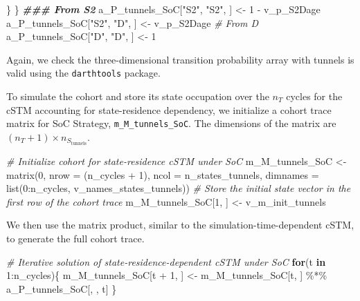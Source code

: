 \documentclass[
]{article}
\newenvironment{Shaded}{\begin{snugshade}}{\end{snugshade}}
\newcommand{\AttributeTok}[1]{\textcolor[rgb]{0.77,0.63,0.00}{#1}}
\newcommand{\CommentTok}[1]{\textcolor[rgb]{0.56,0.35,0.01}{\textit{#1}}}
\newcommand{\ControlFlowTok}[1]{\textcolor[rgb]{0.13,0.29,0.53}{\textbf{#1}}}
\newcommand{\DecValTok}[1]{\textcolor[rgb]{0.00,0.00,0.81}{#1}}
\newcommand{\DocumentationTok}[1]{\textcolor[rgb]{0.56,0.35,0.01}{\textbf{\textit{#1}}}}
\newcommand{\FunctionTok}[1]{\textcolor[rgb]{0.00,0.00,0.00}{#1}}
\newcommand{\NormalTok}[1]{#1}
\newcommand{\OtherTok}[1]{\textcolor[rgb]{0.56,0.35,0.01}{#1}}
\newcommand{\SpecialCharTok}[1]{\textcolor[rgb]{0.00,0.00,0.00}{#1}}
\newcommand{\StringTok}[1]{\textcolor[rgb]{0.31,0.60,0.02}{#1}}
\begin{document}
\begin{Shaded}
\begin{Highlighting}[]
\NormalTok{  \}}
\NormalTok{\}}
\DocumentationTok{\#\#\# From S2}
\NormalTok{a\_P\_tunnels\_SoC[}\StringTok{"S2"}\NormalTok{, }\StringTok{"S2"}\NormalTok{, ] }\OtherTok{\textless{}{-}} \DecValTok{1} \SpecialCharTok{{-}}\NormalTok{ v\_p\_S2Dage}
\NormalTok{a\_P\_tunnels\_SoC[}\StringTok{"S2"}\NormalTok{, }\StringTok{"D"}\NormalTok{, ]  }\OtherTok{\textless{}{-}}\NormalTok{ v\_p\_S2Dage}
\CommentTok{\# From D}
\NormalTok{a\_P\_tunnels\_SoC[}\StringTok{"D"}\NormalTok{, }\StringTok{"D"}\NormalTok{, ] }\OtherTok{\textless{}{-}} \DecValTok{1}
\end{Highlighting}
\end{Shaded}

Again, we check the three-dimensional transition probability array with tunnels is valid using the \texttt{darthtools} package.

To simulate the cohort and store its state occupation over the \(n_T\) cycles for the cSTM accounting for state-residence dependency, we initialize a cohort trace matrix for SoC Strategy, \texttt{m\_M\_tunnels\_SoC}. The dimensions of the matrix are \((n_T+1) \times n_{S_{\text{tunnels}}}\).

\begin{Shaded}
\begin{Highlighting}[]
\CommentTok{\# Initialize cohort for state{-}residence cSTM under SoC}
\NormalTok{m\_M\_tunnels\_SoC }\OtherTok{\textless{}{-}} \FunctionTok{matrix}\NormalTok{(}\DecValTok{0}\NormalTok{, }
                      \AttributeTok{nrow =}\NormalTok{ (n\_cycles }\SpecialCharTok{+} \DecValTok{1}\NormalTok{), }\AttributeTok{ncol =}\NormalTok{ n\_states\_tunnels, }
                      \AttributeTok{dimnames =} \FunctionTok{list}\NormalTok{(}\DecValTok{0}\SpecialCharTok{:}\NormalTok{n\_cycles, v\_names\_states\_tunnels))}
\CommentTok{\# Store the initial state vector in the first row of the cohort trace}
\NormalTok{m\_M\_tunnels\_SoC[}\DecValTok{1}\NormalTok{, ] }\OtherTok{\textless{}{-}}\NormalTok{ v\_m\_init\_tunnels}
\end{Highlighting}
\end{Shaded}

We then use the matrix product, similar to the simulation-time-dependent cSTM, to generate the full cohort trace.

\begin{Shaded}
\begin{Highlighting}[]
\CommentTok{\# Iterative solution of state{-}residence{-}dependent cSTM under SoC}
\ControlFlowTok{for}\NormalTok{(t }\ControlFlowTok{in} \DecValTok{1}\SpecialCharTok{:}\NormalTok{n\_cycles)\{}
\NormalTok{  m\_M\_tunnels\_SoC[t }\SpecialCharTok{+} \DecValTok{1}\NormalTok{, ] }\OtherTok{\textless{}{-}}\NormalTok{ m\_M\_tunnels\_SoC[t, ] }\SpecialCharTok{\%*\%}\NormalTok{ a\_P\_tunnels\_SoC[, , t]}
\NormalTok{\}}
\end{Highlighting}
\end{Shaded}
\end{document}
